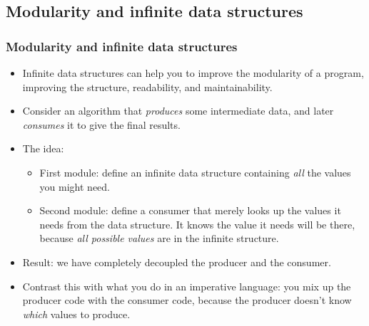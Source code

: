 \documentclass{beamer}
\begin{document}
\subsection{Modularity and infinite data structures}
\begin{frame}[fragile]
\frametitle{Modularity and infinite data structures}

\begin{itemize}
\item Infinite data structures can help you to improve the
  modularity of a program, improving the structure, readability,
  and maintainability.
\item Consider an algorithm that \emph{produces} some intermediate
  data, and later \emph{consumes} it to give the final results.
\item The idea:
  \begin{itemize}
  \item First module: define an infinite data structure containing
    \emph{all} the values you might need.
  \item Second module: define a consumer that merely looks up the
    values it needs from the data structure.  It knows the value it
    needs will be there, because \emph{all possible values} are in
    the infinite structure.
  \end{itemize}
\item Result: we have completely decoupled the producer and the consumer.
\item Contrast this with what you do in an imperative language: you
  mix up the producer code with the consumer code, because the
  producer doesn't know \emph{which} values to produce.
\end{itemize}

\end{frame}

\end{document}
